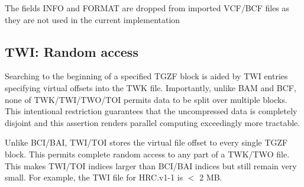 \documentclass[10pt]{article}
\begin{document}
The fields INFO and FORMAT are dropped from imported VCF/BCF files as they are not used in the current implementation

\subsection{TWI: Random access}
Searching to the beginning of a specified TGZF block is aided by TWI entries specifying virtual offsets into the TWK file. Importantly, unlike BAM and BCF, none of TWK/TWI/TWO/TOI permits data to be split over multiple blocks. This intentional restriction guarantees that the uncompressed data is completely disjoint and this assertion renders parallel computing exceedingly more tractable.

Unlike BCI/BAI, TWI/TOI stores the virtual file offset to every single TGZF block. This permits complete random access to any part of a TWK/TWO file. This makes TWI/TOI indices larger than BCI/BAI indices but still remain very small. For example, the TWI file for HRC.v1-1 is $<$ 2 MB.
\end{document}
